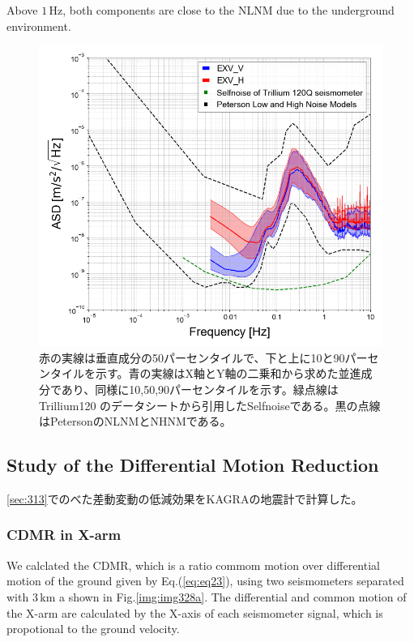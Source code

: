 Above $1\,\mathrm{Hz}$, both components are close to the NLNM due to the underground environment.

\begin{figure}[p]
  \includegraphics[width=13.0cm]{./img_chap3/img313.png}
  \caption{赤の実線は垂直成分の50パーセンタイルで、下と上に10と90パーセンタイルを示す。青の実線はX軸とY軸の二乗和から求めた並進成分であり、同様に10,50,90パーセンタイルを示す。緑点線はTrillium120 のデータシートから引用したSelfnoiseである。黒の点線はPetersonのNLNMとNHNMである。}\label{img:img313}
\end{figure}





\subsection{Study of the Differential Motion Reduction} \label{sec:332}
\cref{sec:313}でのべた差動変動の低減効果をKAGRAの地震計で計算した。



\subsubsection{CDMR in X-arm }
We calclated the CDMR, which is a ratio commom motion over differential motion of the ground given by Eq.(\ref{eq:eq23}), using two seismometers separated with $3\,\mathrm{km}$ a shown in Fig.\ref{img:img328a}. The differential and common motion of the X-arm are calculated by the X-axis of each seismometer signal, which is propotional to the ground velocity. 

